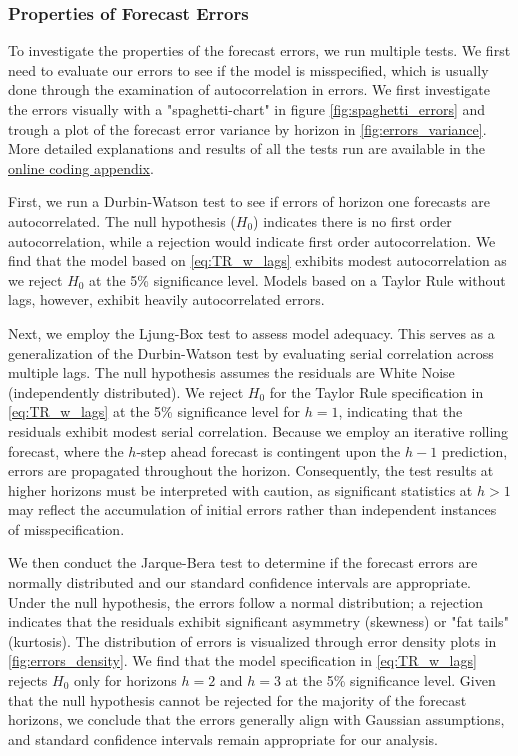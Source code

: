 \subsubsection{Properties of Forecast Errors}

To investigate the properties of the forecast errors, we run multiple tests. We first need to evaluate our errors to see if the model is misspecified, which is usually done through the examination of autocorrelation in errors. We first investigate the errors visually with a "spaghetti-chart" in figure \autoref{fig:spaghetti_errors} and trough a plot of the forecast error variance by horizon in \autoref{fig:errors_variance}. More detailed explanations and results of all the tests run are available in the \href{https://github.com/theshufflebee/therockcast/blob/main/ECB_Project.pdf}{online coding appendix}.

First, we run a Durbin-Watson test \citep{durbinTestingSerialCorrelation1950} to see if errors of horizon one forecasts are autocorrelated. The null hypothesis ($H_0$) indicates there is no first order autocorrelation, while a rejection would indicate first order autocorrelation. We find that the model based on \eqref{eq:TR_w_lags} exhibits modest autocorrelation as we reject $H_0$ at the 5\% significance level. Models based on a Taylor Rule without lags, however, exhibit heavily autocorrelated errors.

Next, we employ the Ljung-Box \citep{ljungMeasureLackFit1978} test to assess model adequacy. This serves as a generalization of the Durbin-Watson test by evaluating serial correlation across multiple lags. The null hypothesis assumes the residuals are White Noise (independently distributed). We reject $H_0$ for the Taylor Rule specification in \eqref{eq:TR_w_lags} at the 5\% significance level for $h=1$, indicating that the residuals exhibit modest serial correlation. Because we employ an iterative rolling forecast, where the $h$-step ahead forecast is contingent upon the $h-1$ prediction, errors are propagated throughout the horizon. Consequently, the test results at higher horizons must be interpreted with caution, as significant statistics at $h > 1$ may reflect the accumulation of initial errors rather than independent instances of misspecification.

We then conduct the Jarque-Bera test \citep{jarqueTestNormalityObservations1987} to determine if the forecast errors are normally distributed and our standard confidence intervals are appropriate. Under the null hypothesis, the errors follow a normal distribution; a rejection indicates that the residuals exhibit significant asymmetry (skewness) or "fat tails" (kurtosis). The distribution of errors is visualized through error density plots in \autoref{fig:errors_density}. We find that the model specification in \eqref{eq:TR_w_lags} rejects $H_0$ only for horizons $h=2$ and $h=3$ at the 5\% significance level. Given that the null hypothesis cannot be rejected for the majority of the forecast horizons, we conclude that the errors generally align with Gaussian assumptions, and standard confidence intervals remain appropriate for our analysis.

